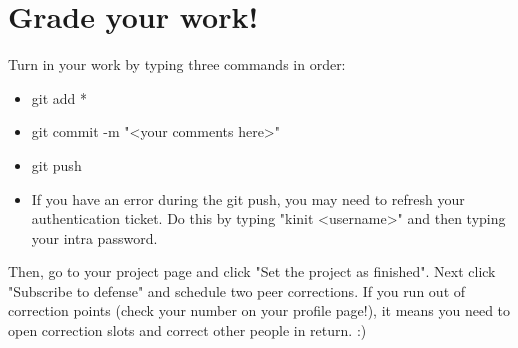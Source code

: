 \documentclass{42-en}
\begin{document}
\chapter{Grade your work!}

Turn in your work by typing three commands in order: 
\begin{itemize}
	\item git add *
	\item git commit -m "<your comments here>"
	\item git push
	\item If you have an error during the git push, you may need to refresh your authentication ticket. Do this by typing "kinit <username>" and then typing your intra password.
\end{itemize}

Then, go to your project page and click "Set the project as finished".
Next click "Subscribe to defense" and schedule two peer corrections.
If you run out of correction points (check your number on your profile page!), it means you need to open correction slots and correct other people in return. :)
\end{document}
